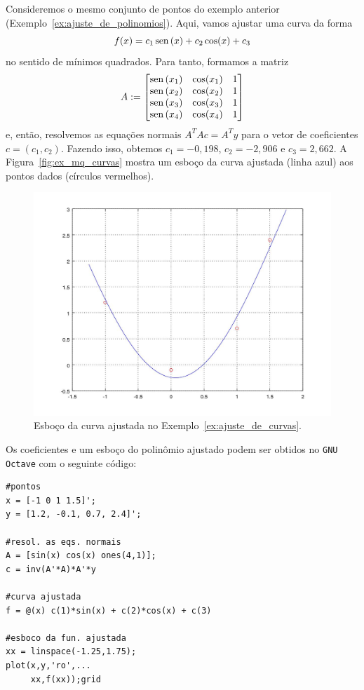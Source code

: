 \begin{ex}\label{ex:ajuste_de_curvas}
  Consideremos o mesmo conjunto de pontos do exemplo anterior (Exemplo~\ref{ex:ajuste_de_polinomios}). Aqui, vamos ajustar uma curva da forma
  \begin{equation}
    f(x) = c_1\operatorname{sen}\,(x) + c_2\cos(x) + c_3
  \end{equation}
no sentido de mínimos quadrados. Para tanto, formamos a matriz
\begin{equation}
  A :=
  \begin{bmatrix}
    \operatorname{sen}\,(x_1) & \cos(x_1) & 1 \\
    \operatorname{sen}\,(x_2) & \cos(x_2) & 1 \\
    \operatorname{sen}\,(x_3) & \cos(x_3) & 1 \\
    \operatorname{sen}\,(x_4) & \cos(x_4) & 1
  \end{bmatrix}
\end{equation}
  e, então, resolvemos as equações normais $A^TAc = A^Ty$ para o vetor de coeficientes $c=(c_1, c_2)$. Fazendo isso, obtemos $c_1=-0,198$, $c_2=-2,906$ e $c_3=2,662$. A Figura~\ref{fig:ex_mq_curvas} mostra um esboço da curva ajustada (linha azul) aos pontos dados (círculos vermelhos).

  \begin{figure}[h]
    \centering
    \includegraphics[width=\textwidth]{cap_ajuste/figs/ex_mq_curvas/ex_mq_curvas}
    \caption{Esboço da curva ajustada no Exemplo~\ref{ex:ajuste_de_curvas}.}
    \label{fig:ex_mq_poli}
  \end{figure}

\ifisoctave
Os coeficientes e um esboço do polinômio ajustado podem ser obtidos no \verb+GNU Octave+ com o seguinte código:
\begin{verbatim}
#pontos
x = [-1 0 1 1.5]';
y = [1.2, -0.1, 0.7, 2.4]';

#resol. as eqs. normais
A = [sin(x) cos(x) ones(4,1)];
c = inv(A'*A)*A'*y

#curva ajustada
f = @(x) c(1)*sin(x) + c(2)*cos(x) + c(3)

#esboco da fun. ajustada
xx = linspace(-1.25,1.75);
plot(x,y,'ro',...
     xx,f(xx));grid
\end{verbatim}
\fi

\end{ex}

